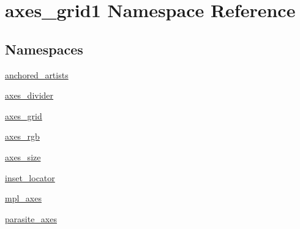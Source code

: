\hypertarget{namespaceaxes__grid1}{}\section{axes\+\_\+grid1 Namespace Reference}
\label{namespaceaxes__grid1}
\subsection*{Namespaces}
\begin{DoxyCompactItemize}
\item 
 \hyperlink{namespaceaxes__grid1_1_1anchored__artists}{anchored\+\_\+artists}
\item 
 \hyperlink{namespaceaxes__grid1_1_1axes__divider}{axes\+\_\+divider}
\item 
 \hyperlink{namespaceaxes__grid1_1_1axes__grid}{axes\+\_\+grid}
\item 
 \hyperlink{namespaceaxes__grid1_1_1axes__rgb}{axes\+\_\+rgb}
\item 
 \hyperlink{namespaceaxes__grid1_1_1axes__size}{axes\+\_\+size}
\item 
 \hyperlink{namespaceaxes__grid1_1_1inset__locator}{inset\+\_\+locator}
\item 
 \hyperlink{namespaceaxes__grid1_1_1mpl__axes}{mpl\+\_\+axes}
\item 
 \hyperlink{namespaceaxes__grid1_1_1parasite__axes}{parasite\+\_\+axes}
\end{DoxyCompactItemize}
